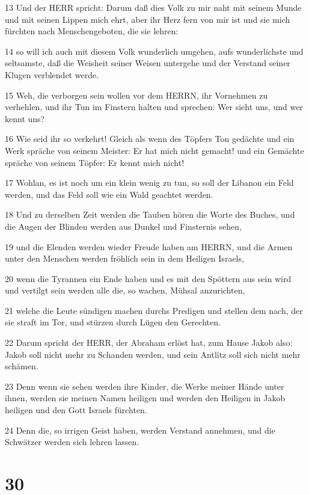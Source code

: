 \par 13 Und der HERR spricht: Darum daß dies Volk zu mir naht mit seinem Munde und mit seinen Lippen mich ehrt, aber ihr Herz fern von mir ist und sie mich fürchten nach Menschengeboten, die sie lehren:
\par 14 so will ich auch mit diesem Volk wunderlich umgehen, aufs wunderlichste und seltsamste, daß die Weisheit seiner Weisen untergehe und der Verstand seiner Klugen verblendet werde.
\par 15 Weh, die verborgen sein wollen vor dem HERRN, ihr Vornehmen zu verhehlen, und ihr Tun im Finstern halten und sprechen: Wer sieht uns, und wer kennt uns?
\par 16 Wie seid ihr so verkehrt! Gleich als wenn des Töpfers Ton gedächte und ein Werk spräche von seinem Meister: Er hat mich nicht gemacht! und ein Gemächte spräche von seinem Töpfer: Er kennt mich nicht!
\par 17 Wohlan, es ist noch um ein klein wenig zu tun, so soll der Libanon ein Feld werden, und das Feld soll wie ein Wald geachtet werden.
\par 18 Und zu derselben Zeit werden die Tauben hören die Worte des Buches, und die Augen der Blinden werden aus Dunkel und Finsternis sehen,
\par 19 und die Elenden werden wieder Freude haben am HERRN, und die Armen unter den Menschen werden fröhlich sein in dem Heiligen Israels,
\par 20 wenn die Tyrannen ein Ende haben und es mit den Spöttern aus sein wird und vertilgt sein werden alle die, so wachen, Mühsal anzurichten,
\par 21 welche die Leute sündigen machen durchs Predigen und stellen dem nach, der sie straft im Tor, und stürzen durch Lügen den Gerechten.
\par 22 Darum spricht der HERR, der Abraham erlöst hat, zum Hause Jakob also: Jakob soll nicht mehr zu Schanden werden, und sein Antlitz soll sich nicht mehr schämen.
\par 23 Denn wenn sie sehen werden ihre Kinder, die Werke meiner Hände unter ihnen, werden sie meinen Namen heiligen und werden den Heiligen in Jakob heiligen und den Gott Israels fürchten.
\par 24 Denn die, so irrigen Geist haben, werden Verstand annehmen, und die Schwätzer werden sich lehren lassen.

\chapter{30}

